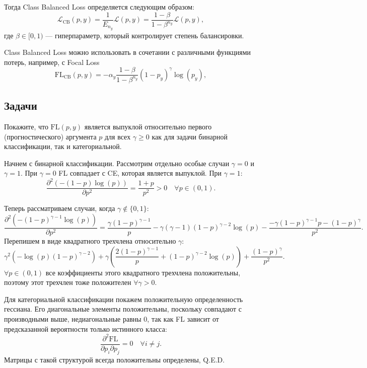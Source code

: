 Тогда Class Balanced Loss определяется следующим образом:
\[
    \mathcal{L}_\text{CB}(p,y) = \dfrac{1}{E_{n_y}}\mathcal{L}(p,y) = \dfrac{1-\beta}{1-\beta^{n_y}}\mathcal{L}(p,y),
\]
где $\beta \in [0,1)$ — гиперпараметр, который контролирует степень балансировки.

\begin{remark}
    Class Balanced Loss можно использовать в сочетании с различными функциями потерь, например, с Focal Loss
    \[
        \text{FL}_\text{CB}(p,y)=-\alpha_y\dfrac{1-\beta}{1-\beta^{n_y}}(1-p_y)^\gamma\log(p_y),
    \]
\end{remark}

\subsection*{Задачи}

\begin{problem}
    Покажите, что $\text{FL}(p,y)$ является выпуклой относительно первого (прогностического) аргумента $p$ для всех $\gamma \ge 0$ как для задачи бинарной классификации, так и категориальной.
\end{problem}

\begin{solution}
    Начнем с бинарной классификации. Рассмотрим отдельно особые случаи $\gamma=0$ и $\gamma=1$. При $\gamma=0$ FL совпадает с CE, которая является выпуклой. При $\gamma=1$:
    \[
        \dfrac{\partial^2\left(-(1-p)\log(p)\right)}{\partial p^2}=\dfrac{1+p}{p^2}>0 \quad \forall p \in (0,1).
    \]
    
    Теперь рассматриваем случаи, когда $\gamma\notin\{0,1\}$:
    \[
        \dfrac{\partial^2\left(-(1-p)^{\gamma-1}\log(p)\right)}{\partial p^2}=\dfrac{\gamma(1-p)^{\gamma-1}}{p}-\gamma(\gamma-1)(1-p)^{\gamma-2}\log(p)-\dfrac{-\gamma(1-p)^{\gamma-1}p-(1-p)^\gamma}{p^2}.
    \]
    Перепишем в виде квадратного трехчлена относительно $\gamma$:
    \[
        \gamma^2\left(-\log(p)(1-p)^{\gamma-2}\right)+\gamma\left(\dfrac{2(1-p)^{\gamma-1}}{p}+(1-p)^{\gamma-2}\log(p)\right)+\dfrac{(1-p)^\gamma}{p^2}.
    \]
    $\forall p \in (0,1)$ все коэффициенты этого квадратного трехчлена положительны, поэтому этот трехчлен тоже положителен $\forall \gamma>0$.

    Для категориальной классификации покажем положительную определенность гессиана. Его диагональные элементы положительны, поскольку совпадают с производными выше, недиагональные равны 0, так как FL зависит от предсказанной вероятности только истинного класса:
    \[
        \dfrac{\partial^2\text{FL}}{\partial p_i \partial p_j}=0 \quad \forall i \neq j.
    \]
    Матрицы с такой структурой всегда положительны определены, Q.E.D.
\end{solution}

